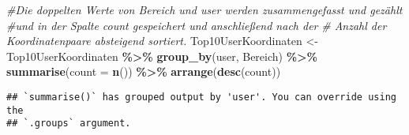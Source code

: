\documentclass[
]{article}
\newenvironment{Shaded}{\begin{snugshade}}{\end{snugshade}}
\newcommand{\AttributeTok}[1]{\textcolor[rgb]{0.13,0.29,0.53}{#1}}
\newcommand{\CommentTok}[1]{\textcolor[rgb]{0.56,0.35,0.01}{\textit{#1}}}
\newcommand{\FunctionTok}[1]{\textcolor[rgb]{0.13,0.29,0.53}{\textbf{#1}}}
\newcommand{\NormalTok}[1]{#1}
\newcommand{\OtherTok}[1]{\textcolor[rgb]{0.56,0.35,0.01}{#1}}
\newcommand{\SpecialCharTok}[1]{\textcolor[rgb]{0.81,0.36,0.00}{\textbf{#1}}}
\begin{document}
\begin{Shaded}
\begin{Highlighting}[]
\CommentTok{\#Die doppelten Werte von Bereich und user werden zusammengefasst und gezählt}
\CommentTok{\#und in der Spalte count gespeichert und anschließend nach der}
\CommentTok{\# Anzahl der Koordinatenpaare absteigend sortiert.}
\NormalTok{Top10UserKoordinaten }\OtherTok{\textless{}{-}}\NormalTok{ Top10UserKoordinaten }\SpecialCharTok{\%\textgreater{}\%} \FunctionTok{group\_by}\NormalTok{(user, Bereich) }\SpecialCharTok{\%\textgreater{}\%}
  \FunctionTok{summarise}\NormalTok{(}\AttributeTok{count =} \FunctionTok{n}\NormalTok{()) }\SpecialCharTok{\%\textgreater{}\%} \FunctionTok{arrange}\NormalTok{(}\FunctionTok{desc}\NormalTok{(count))}
\end{Highlighting}
\end{Shaded}

\begin{verbatim}
## `summarise()` has grouped output by 'user'. You can override using the
## `.groups` argument.
\end{verbatim}
\end{document}
